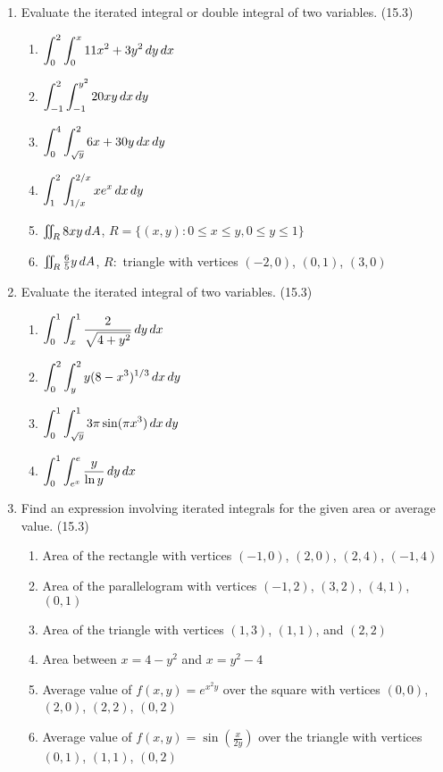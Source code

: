 \begin{enumerate}
    \item Evaluate the iterated integral or double integral of two variables. (15.3)

      \begin{enumerate}
        \item $\displaystyle\int_0^2\int_0^x 11x^2+3y^2\,d{y}\,d{x}$
        \item $\displaystyle\int_{-1}^2\int_{-1}^{y^2} 20xy\,d{x}\,d{y}$
        \item $\displaystyle\int_0^4\int_{\sqrt{y}}^2 6x+30y\,d{x}\,d{y}$
        \item $\displaystyle\int_{1}^{2}\int_{1/x}^{2/x} xe^x \,d{x}\,d{y}$
        \item $\iint_R 8xy\,d{A}$, $R = \{ (x,y) : 0\leq x\leq y,0\leq y\leq 1\}$
        \item $\iint_R \frac{6}{5}y\,d{A}$, $R:$ triangle with vertices $(-2,0)$, $(0,1)$, $(3,0)$
      \end{enumerate}

    \newpage

    \item Evaluate the iterated integral of two variables. (15.3)

      \begin{enumerate}
        \item $\displaystyle\int_0^1\int_x^1 \frac{2}{\sqrt{4+y^2}}\,d{y}\,d{x}$
        \item $\displaystyle\int_0^2\int_y^2 y(8-x^3)^{1/3}\,d{x}\,d{y}$
        \item $\displaystyle\int_0^1\int_{\sqrt{y}}^1 3\pi \sin(\pi x^3)\,d{x}\,d{y}$
        \item $\displaystyle\int_0^1\int_{e^x}^e \frac{y}{\ln y}\,d{y}\,d{x}$
      \end{enumerate}

    \item Find an expression involving iterated integrals for the given area or average value. (15.3)

      \begin{enumerate}
        \item Area of the rectangle with vertices $(-1,0)$, $(2,0)$, $(2,4)$, $(-1,4)$
        \item Area of the parallelogram with vertices $(-1,2)$, $(3,2)$, $(4,1)$, $(0,1)$
        \item Area of the triangle with vertices $(1,3)$, $(1,1)$, and $(2,2)$
        \item Area between $x=4-y^2$ and $x=y^2-4$
        \item Average value of $f(x,y)=e^{x^2y}$ over the square with vertices $(0,0)$, $(2,0)$, $(2,2)$, $(0,2)$
        \item Average value of $f(x,y)=\sin(\frac{x}{2y})$ over the triangle with vertices $(0,1)$, $(1,1)$, $(0,2)$
      \end{enumerate}


\end{enumerate}
